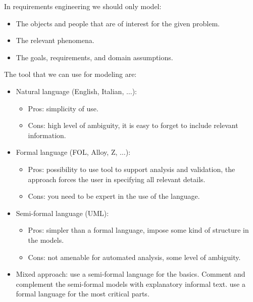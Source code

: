 \documentclass[12pt, a4paper]{report}
\theoremstyle{remark}
\begin{document}
    \par
    In requirements engineering we should only model:
    \begin{itemize}
        \item The objects and people that are of interest for the given problem.
        \item The relevant phenomena.
        \item The goals, requirements, and domain assumptions.
    \end{itemize}
    The tool that we can use for modeling are: 
    \begin{itemize}
        \item Natural language (English, Italian, $\dots$):
        \begin{itemize}
            \item Pros: simplicity of use.
            \item Cons: high level of ambiguity, it is easy to forget to include relevant information.
        \end{itemize}
        \item Formal language (FOL, Alloy, Z, $\dots$):
        \begin{itemize}
            \item Pros: possibility to use tool to support analysis and validation, the approach forces the user in specifying all relevant details.
            \item Cons: you need to be expert in the use of the language.
        \end{itemize}
        \item Semi-formal language (UML):
        \begin{itemize}
            \item Pros: simpler than a formal language, impose some kind of structure in the models.
            \item Cons: not amenable for automated analysis, some level of ambiguity.
        \end{itemize}
        \item Mixed approach: use a semi-formal language for the basics. Comment and complement the semi-formal models with explanatory informal text. use a formal language for the most critical parts.
    \end{itemize}
\end{document}
